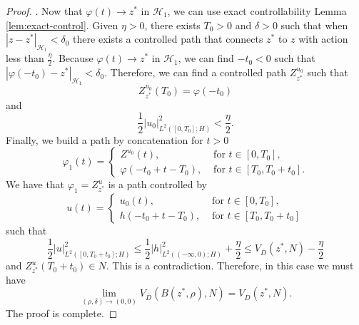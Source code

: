 \documentclass[10pt, reqno]{amsart}
\newcommand{\h}{\mathcal{H}}
\theoremstyle{definition}
\numberwithin{lem}{section}
\numberwithin{cor}{section}
\numberwithin{prop}{section}
\numberwithin{thm}{section}
\numberwithin{dfn}{section}
\begin{document}
\begin{proof}
. Now that $\varphi(t) \to z^*$ in $\h_1$, we can use exact controllability Lemma \ref{lem:exact-control}.
Given $\eta>0$, there exists $T_0>0$ and $\delta>0$ such that when $|z-z^*|_{\h_1}< \delta_0$ there exists a controlled path that connects $z^*$ to $z$ with action less than $\frac{\eta}{2}$. Because $\varphi(t) \to z^*$ in $\h_1$, we can find $-t_0<0$ such that $|\varphi(-t_0) - z^*|_{\h_1}<\delta_0$. Therefore, we can find a controlled path $Z^{u_0}_{z^*}$ such that
\begin{equation*}
    Z^{u_0}_{z^*}(T_0) = \varphi(-t_0)
\end{equation*}
and
\begin{equation*}
    \frac{1}{2}|u_0|_{L^2([0,T_0];H)}^2 < \frac{\eta}{2}.
\end{equation*}
Finally, we build a path by concatenation for $t>0$
\begin{equation*}
    \varphi_1(t) = 
    \begin{cases}
        Z^{u_0} (t), & \text{ for } t \in [0,T_0],\\
        \varphi(-t_0 + t - T_0), & \text{ for } t \in [T_0, T_0  + t_0].
    \end{cases}
\end{equation*}
We have that $\varphi_1 = Z^{u}_{z^*}$ is a path controlled by
\begin{equation*}
    u(t) = 
    \begin{cases}
        u_0(t), & \text{ for } t \in [0,T_0],\\
        h(-t_0 + t - T_0),  &\text{ for } t \in [T_0, T_0 + t_0]
    \end{cases}
\end{equation*}
 such that
\begin{equation*}
    \frac{1}{2}|u|_{L^2([0,T_0 + t_0];H)}^2 \leq \frac{1}{2}|h|_{L^2((-\infty,0);H)}^2 + \frac{\eta}{2} \leq V_{\bar{D}}(z^*, N) - \frac{\eta}{2}
\end{equation*}
and $Z^{u}_{z^*}(T_0 + t_0) \in N.$
This is a contradiction. Therefore, in this case we must have
\begin{equation*}
    \lim_{(\rho, \delta)\rightarrow (0,0)} V_{\bar{D}}(B(z^*,\rho),N) = V_{\bar{D}}(z^*, N).
\end{equation*}
The proof is complete.
\end{proof}

 
\end{document}
